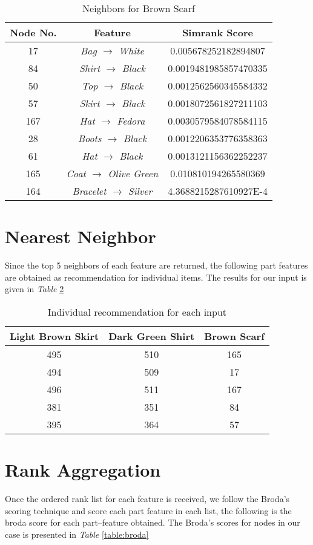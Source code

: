 \begin{table}
\centering
\caption{Neighbors for Brown Scarf}
\begin{tabular}{|c|c|c|}
\hline
Node No. & Feature & Simrank Score\\
\hline\hline
17 & \textit{Bag $
\rightarrow$ White} & 0.005678252182894807 \\
84 & \textit{Shirt $
\rightarrow$ Black} & 0.0019481985857470335 \\
50 & \textit{Top $
\rightarrow$ Black} & 0.0012562560345584332 \\
57 & \textit{Skirt $
\rightarrow$ Black} & 0.0018072561827211103 \\
167 & \textit{Hat $\rightarrow$ Fedora} & 0.0030579584078584115 \\
28 & \textit{Boots $
\rightarrow$ Black} & 0.0012206353776358363 \\
61 & \textit{Hat $
\rightarrow$ Black} & 0.0013121156362252237 \\
165 & \textit{Coat $\rightarrow$ Olive Green} & 0.010810194265580369 \\
164 & \textit{Bracelet $\rightarrow$ Silver} & 4.3688215287610927E-4 \\
\hline\end{tabular}
\label{table:neighbor3}
\end{table}

\section{Nearest Neighbor}
Since  the top 5 neighbors of each feature are returned, the following part features are obtained as recommendation for individual items. The results for our input is given in \textit{Table} \ref{table:individualReco}
\begin{table}
\centering
\caption{Individual recommendation for each input}
\begin{tabular}{|c|c|c|}
\hline
Light Brown Skirt & Dark Green Shirt & Brown Scarf\\
\hline\hline
495 & 510 &  165 \\
494 & 509 &  17 \\
496 & 511 &  167 \\
381 & 351 &  84 \\
395 & 364 &  57 \\
\hline\end{tabular}
\label{table:individualReco}
\end{table}


\section{Rank Aggregation}
Once the ordered rank list for each feature is received, we follow the Broda's scoring technique and score each part feature in each list, the following is the broda score for each part--feature obtained. The Broda's scores for nodes in our case is presented in \textit{Table} \ref{table:broda}

